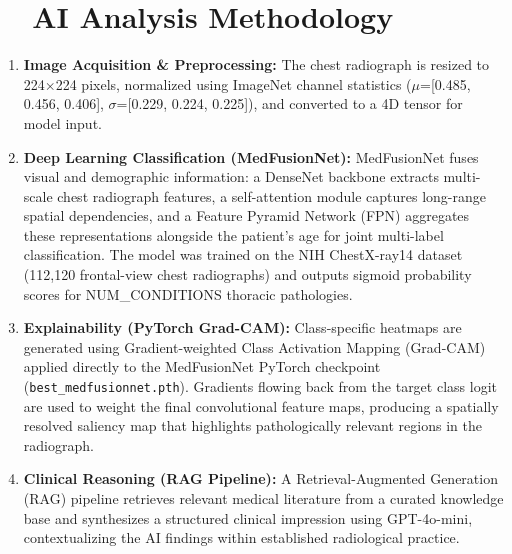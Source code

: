 \documentclass[11pt, a4paper]{article}
\begin{document}
\vspace{0.6em}

\section*{\faCogs\ \ AI Analysis Methodology}

\begin{methodbox}
\begin{enumerate}[leftmargin=1.5em, itemsep=4pt, label=\textbf{\arabic*.}]
	\item \textbf{Image Acquisition \& Preprocessing:}
		The chest radiograph is resized to 224$\times$224 pixels, normalized using ImageNet channel statistics
		($\mu$=[0.485, 0.456, 0.406], $\sigma$=[0.229, 0.224, 0.225]), and converted to a 4D tensor for model input.

	\item \textbf{Deep Learning Classification (MedFusionNet):}
		MedFusionNet fuses visual and demographic information: a DenseNet backbone extracts multi-scale
		chest radiograph features, a self-attention module captures long-range spatial dependencies,
		and a Feature Pyramid Network (FPN) aggregates these representations alongside the patient's
		age for joint multi-label classification.
		The model was trained on the NIH ChestX-ray14 dataset (112,120 frontal-view chest radiographs)
		and outputs sigmoid probability scores for {{NUM_CONDITIONS}} thoracic pathologies.

	\item \textbf{Explainability (PyTorch Grad-CAM):}
		Class-specific heatmaps are generated using Gradient-weighted Class Activation Mapping (Grad-CAM)
		applied directly to the MedFusionNet PyTorch checkpoint (\texttt{best\_medfusionnet.pth}).
		Gradients flowing back from the target class logit are used to weight the final convolutional
		feature maps, producing a spatially resolved saliency map that highlights pathologically
		relevant regions in the radiograph.

	\item \textbf{Clinical Reasoning (RAG Pipeline):}
		A Retrieval-Augmented Generation (RAG) pipeline retrieves relevant medical literature from a curated
		knowledge base and synthesizes a structured clinical impression using GPT-4o-mini,
		contextualizing the AI findings within established radiological practice.
\end{enumerate}
\end{methodbox}
\end{document}

